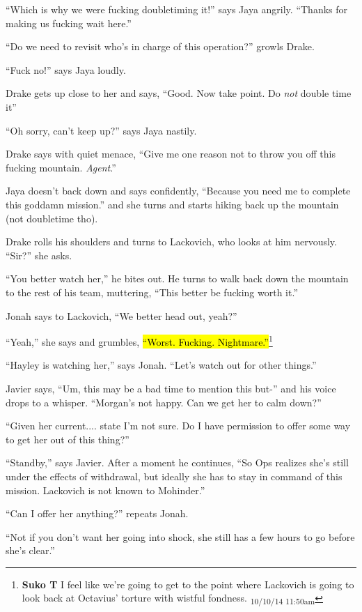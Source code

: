 ``Which is why we were fucking doubletiming it!'' says Jaya angrily.  ``Thanks for making us fucking wait here.''

``Do we need to revisit who's in charge of this operation?'' growls Drake.

``Fuck no!'' says Jaya loudly.

Drake gets up close to her and says, ``Good.  Now take point.  Do \textit{not} double time it''

``Oh sorry, can't keep up?'' says Jaya nastily.

Drake says with quiet menace, ``Give me one reason not to throw you off this fucking mountain.  \textit{Agent}.''

Jaya doesn't back down and says confidently, ``Because you need me to complete this goddamn mission.'' and she turns and starts hiking back up the mountain (not doubletime tho).

Drake rolls his shoulders and turns to Lackovich, who looks at him nervously.  ``Sir?'' she asks.

``You better watch her,'' he bites out.  He turns to walk back down the mountain to the rest of his team, muttering, ``This better be fucking worth it.''

Jonah says to Lackovich, ``We better head out, yeah?''

``Yeah,'' she says and grumbles, \hl{``Worst.  Fucking.  Nightmare.''}\footnote{\textbf{Suko T }I feel like we're going to get to the point where Lackovich is going to look back at Octavius' torture with wistful fondness. \textsubscript{10/10/14 11:50am}}

``Hayley is watching her,'' says Jonah.  ``Let's watch out for other things.''

Javier says, ``Um, this may be a bad time to mention this but-'' and his voice drops to a whisper. ``Morgan's not happy.  Can we get her to calm down?''

``Given her current.... state I'm not sure.  Do I have permission to offer some way to get her out of this thing?''

``Standby,'' says Javier.  After a moment he continues, ``So Ops realizes she's still under the effects of withdrawal, but ideally she has to stay in command of this mission.  Lackovich is not known to Mohinder.''

``Can I offer her anything?'' repeats Jonah.

``Not if you don't want her going into shock, she still has a few hours to go before she's clear.''

